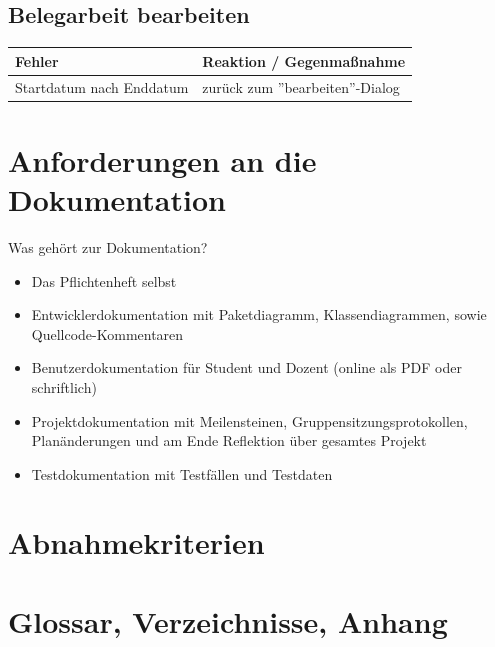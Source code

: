 \documentclass{article}
\begin{document}
\subsection{Belegarbeit bearbeiten}
\begin{tabular}{|p{7cm}|p{7cm}|}
\hline
	\textbf{Fehler}				&	\textbf{Reaktion / Gegenmaßnahme}	\\
\hline
\hline
	Startdatum nach Enddatum	&	zurück zum ''bearbeiten''-Dialog	\\
\hline
\end{tabular}

\section{Anforderungen an die Dokumentation}
Was gehört zur Dokumentation?
\begin{itemize}
\item Das Pflichtenheft selbst
\item Entwicklerdokumentation mit Paketdiagramm, Klassendiagrammen, sowie Quellcode-Kommentaren
\item Benutzerdokumentation für Student und Dozent (online als PDF oder schriftlich)
\item Projektdokumentation mit Meilensteinen, Gruppensitzungsprotokollen, Planänderungen und am Ende Reflektion über gesamtes Projekt
\item Testdokumentation mit Testfällen und Testdaten
\end{itemize}

\section{Abnahmekriterien}


\section{Glossar, Verzeichnisse, Anhang}
\end{document}
